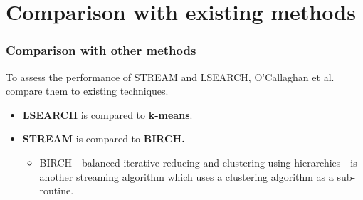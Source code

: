 \documentclass{beamer}
\begin{document}
\section{Comparison with existing methods}
\frame
{
  \frametitle{Comparison with other methods}
  To assess the performance of STREAM and LSEARCH, O'Callaghan et al. compare them to existing techniques.
  
  \bigskip 
  \begin{itemize}
  \item{\textbf{LSEARCH} is compared to \textbf{k-means}.}
  
  \bigskip
  \item{\textbf{STREAM} is compared to \textbf{BIRCH.}
    \begin{itemize}
      \item{BIRCH - balanced iterative reducing and clustering using hierarchies - is another streaming algorithm which uses a clustering algorithm as a sub-routine.}
    \end{itemize}
  }
  	     
  \end{itemize}
}
\end{document}
